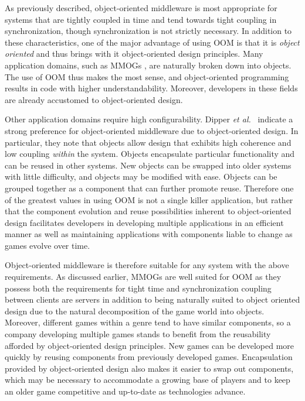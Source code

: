 \documentclass{acm_proc_article-sp}
\def\etal{{\it et al.\/}}
\begin{document}
As previously described, object-oriented middleware is most appropriate for systems that are tightly coupled in time and tend towards tight coupling in synchronization, though synchronization is not strictly necessary. In addition to these characteristics, one of the major advantage of using OOM is that it is \textit{object oriented} and thus brings with it object-oriented design principles.  Many application domains, such as MMOGs \cite{Denault:2008p8364}, are naturally broken down into objects.  The use of OOM thus makes the most sense, and object-oriented programming results in code with higher understandability.  Moreover, developers in these fields are already accustomed to object-oriented design.

Other application domains require high configurability. Dipper \etal\ \cite{Dipper:2004p8366} indicate a strong preference for object-oriented middleware due to object-oriented design.  In particular, they note that objects allow design that exhibits high coherence and low coupling \textit{within} the system.  Objects encapsulate particular functionality and can be reused in other systems.  New objects can be swapped into older systems with little difficulty, and objects may be modified with ease.  Objects can be grouped together as a component that can further promote reuse.  Therefore one of the greatest values in using OOM is not a single killer application, but rather that the component evolution and reuse possibilities inherent to object-oriented design facilitates developers in developing multiple applications in an efficient manner as well as maintaining applications with components liable to change as games evolve over time.


Object-oriented middleware is therefore suitable for any system with the above requirements. As discussed earlier, MMOGs are well suited for OOM as they possess both the requirements for tight time and synchronization coupling between clients are servers in addition to being naturally suited to object oriented design due to the natural decomposition of the game world into objects. Moreover, different games within a genre tend to have similar components, so a company developing multiple games stands to benefit from the reusability afforded by object-oriented design principles.  New games can be developed more quickly by reusing components from previously developed games.  Encapsulation provided by object-oriented design also makes it easier to swap out components, which may be necessary to accommodate a growing base of players and to keep an older game competitive and up-to-date as technologies advance. 
\end{document}
